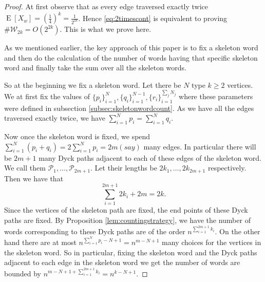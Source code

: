 \documentclass[12pt]{article}
\numberwithin{equation}{section}
\numberwithin{equation}{section}
\theoremstyle{definition}
\DeclareMathOperator{\E}{E} \DeclareMathOperator{\var}{Var}
\renewcommand{\1}{\bf 1}
\begin{document}
\begin{proof}
At first observe that as every edge traversed exactly twice $\E[X_{w}]=\left(\frac{1}{4}\right)^{k}=\frac{1}{2^{2k}}$. Hence \eqref{eq:2timescont} is equivalent to proving $\#\mathcal{W}_{2k}=O\left( 2^{2k} \right).$ This is what we prove here. 

As we mentioned earlier, the key approach of this paper is to fix a skeleton word and then do the calculation of the number of words having that specific skeleton word and finally take the sum over all the skeleton words.

So at the beginning we fix a skeleton word. Let there be $N$ type $k\ge 2$ vertices. We at first fix the values of $\{p_{i}\}_{i=1}^{N}, \{ q_{i} \}_{i=1}^{N-1}, \{ r_{i} \}_{i=1}^{\sum_{j}N_{j}}$ where these parameters were defined in subsection \ref{subsec:skeletonwordcount}. %
As we have all the edges traversed exactly twice, we have $\sum_{i=1}^{N}p_{i}= \sum_{i=1}^{N} q_{i}$. 

Now once the skeleton word is fixed, we spend $\sum_{i=1}^{N}\left(p_{i}+q_{i}\right)= 2\sum_{i=1}^{N}p_{i}=2m(say)$ many edges. In particular there will be $2m+1$ many Dyck paths adjacent to each of these edges of the skeleton word. We call them $\mathcal{P}_{1},\ldots, \mathcal{P}_{2m+1}$. Let their lengths be $2k_{1},\ldots, 2k_{2m+1}$ respectively. Then we have that 
\begin{equation}\label{eq:basicequality}
\sum_{i=1}^{2m+1} 2k_{i}+2m =2k.
\end{equation}
Since the vertices of the skeleton path are fixed, the end points of these Dyck paths are fixed.
By Proposition \ref{lem:countingstrategy}, we have the number of words corresponding to these Dyck paths are of the order $n^{\sum_{i=1}^{2m+1}k_{i}}$. On the other hand there are at most $n^{\sum_{i=1}^{N}p_{i}- N +1}= n^{m-N+1}$ many choices for the vertices in the skeleton word. So in particular, fixing the skeleton word and the Dyck paths adjacent to each edge in the skeleton word we get the number of words are bounded by $n^{m-N+1+ \sum_{i=1}^{2m+1}k_{i}}= n^{k-N+1}$. 


\end{proof}
\end{document}

